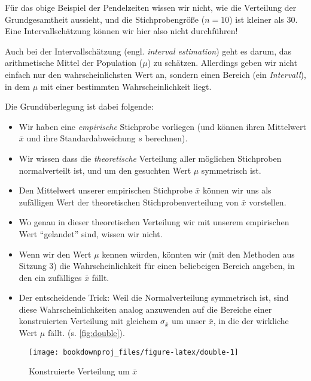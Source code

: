 \documentclass[
  ngerman,
]{article}
\providecommand{\tightlist}{%
  \setlength{\itemsep}{0pt}\setlength{\parskip}{0pt}}
\begin{document}
Für das obige Beispiel der Pendelzeiten wissen wir nicht, wie die Verteilung der Grundgesamtheit aussieht, und die Stichprobengröße (\(n=10\)) ist kleiner als 30. Eine Intervallschätzung können wir hier also nicht durchführen!

Auch bei der Intervallschätzung (engl. \emph{interval estimation}) geht es darum, das arithmetische Mittel der Population (\(\mu\)) zu schätzen. Allerdings geben wir nicht einfach nur den wahrscheinlichsten Wert an, sondern einen Bereich (ein \emph{Intervall}), in dem \(\mu\) mit einer bestimmten Wahrscheinlichkeit liegt.

Die Grundüberlegung ist dabei folgende:

\begin{itemize}
\tightlist
\item
  Wir haben eine \emph{empirische} Stichprobe vorliegen (und können ihren Mittelwert \(\bar{x}\) und ihre Standardabweichung \(s\) berechnen).
\item
  Wir wissen dass die \emph{theoretische} Verteilung aller möglichen Stichproben normalverteilt ist, und um den gesuchten Wert \(\mu\) symmetrisch ist.
\item
  Den Mittelwert unserer empirischen Stichprobe \(\bar{x}\) können wir uns als zufälligen Wert der theoretischen Stichprobenverteilung von \(\bar{x}\) vorstellen.
\item
  Wo genau in dieser theoretischen Verteilung wir mit unserem empirischen Wert ``gelandet'' sind, wissen wir nicht.
\item
  Wenn wir den Wert \(\mu\) kennen würden, könnten wir (mit den Methoden aus Sitzung 3) die Wahrscheinlichkeit für einen beliebeigen Bereich angeben, in den ein zufälliges \(\bar{x}\) fällt.
\item
  Der entscheidende Trick: Weil die Normalverteilung symmetrisch ist, sind diese Wahrscheinlichkeiten analog anzuwenden auf die Bereiche einer konstruierten Verteilung mit gleichem \(\sigma_{\bar{x}}\) um unser \(\bar{x}\), in die der wirkliche Wert \(\mu\) fällt. (s. \autoref{fig:double}).
\end{itemize}

\begin{figure}[h]

{\centering \texttt{[image: bookdownproj\_files/figure-latex/double-1]} 

}

\caption{Konstruierte Verteilung um $\bar{x}$}\label{fig:double}
\end{figure}
\end{document}

